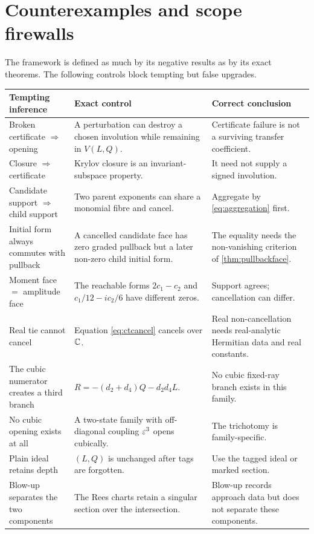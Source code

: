 \section{Counterexamples and scope firewalls}\label{sec:scope}

The framework is defined as much by its negative results as by its exact
theorems.  The following controls block tempting but false upgrades.

\begin{longtable}{p{}p{}p{}}
\toprule
Tempting inference & Exact control & Correct conclusion\\
\midrule
\endhead
Broken certificate \(\Rightarrow\) opening & A perturbation can destroy a
chosen involution while remaining in \(V(L,Q)\). & Certificate failure is not a
surviving transfer coefficient.\\
Closure \(\Rightarrow\) certificate & Krylov closure is an invariant-subspace
property. & It need not supply a signed involution.\\
Candidate support \(\Rightarrow\) child support & Two parent exponents can
share a monomial fibre and cancel. & Aggregate by \cref{eq:aggregation} first.\\
Initial form always commutes with pullback & A cancelled candidate face has
zero graded pullback but a later non-zero child initial form. & The equality
needs the non-vanishing criterion of \cref{thm:pullbackface}.\\
Moment face \(=\) amplitude face & The reachable forms
\(2c_1-c_2\) and \(c_1/12-ic_2/6\) have different zeros. & Support agrees;
cancellation can differ.\\
Real tie cannot cancel & Equation \cref{eq:ctcancel} cancels over \(\mathbb C\). & Real
non-cancellation needs real-analytic Hermitian data and real constants.\\
The cubic numerator creates a third branch & \(R=-(d_2+d_4)Q-d_2d_4L\). & No
cubic fixed-ray branch exists in this family.\\
No cubic opening exists at all & A two-state family with off-diagonal coupling
\(\varepsilon^3\) opens cubically. & The trichotomy is family-specific.\\
Plain ideal retains depth & \((L,Q)\) is unchanged after tags are forgotten. &
Use the tagged ideal or marked section.\\
Blow-up separates the two components & The Rees charts retain a singular
section over the intersection. & Blow-up records approach data but does not
separate these components.\\

\end{longtable}

